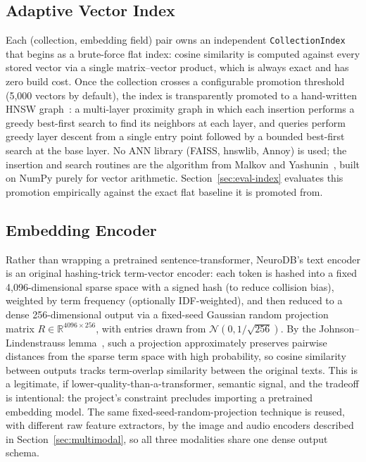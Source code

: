 \documentclass[conference]{IEEEtran}
\begin{document}
\subsection{Adaptive Vector Index}
\label{sec:index}

Each (collection, embedding field) pair owns an independent \texttt{CollectionIndex} that
begins as a brute-force flat index: cosine similarity is computed against every stored
vector via a single matrix--vector product, which is always exact and has zero build cost.
Once the collection crosses a configurable promotion threshold (5{,}000 vectors by default),
the index is transparently promoted to a hand-written HNSW graph~\cite{malkov2018hnsw}: a
multi-layer proximity graph in which each insertion performs a greedy best-first search to
find its neighbors at each layer, and queries perform greedy layer descent from a single
entry point followed by a bounded best-first search at the base layer. No ANN library
(FAISS, hnswlib, Annoy) is used; the insertion and search routines are the algorithm from
Malkov and Yashunin~\cite{malkov2018hnsw}, built on NumPy purely for vector arithmetic.
Section~\ref{sec:eval-index} evaluates this promotion empirically against the exact flat
baseline it is promoted from.

\subsection{Embedding Encoder}
\label{sec:embedding}

Rather than wrapping a pretrained sentence-transformer, NeuroDB's text encoder is an
original hashing-trick term-vector encoder: each token is hashed into a fixed 4{,}096-dimensional
sparse space with a signed hash (to reduce collision bias), weighted by term frequency
(optionally IDF-weighted), and then reduced to a dense 256-dimensional output via a
fixed-seed Gaussian random projection matrix $R \in \mathbb{R}^{4096 \times 256}$, with
entries drawn from $\mathcal{N}(0, 1/\sqrt{256})$. By the Johnson--Lindenstrauss
lemma~\cite{johnson1984extensions}, such a projection approximately preserves pairwise
distances from the sparse term space with high probability, so cosine similarity between
outputs tracks term-overlap similarity between the original texts. This is a legitimate,
if lower-quality-than-a-transformer, semantic signal, and the tradeoff is intentional: the
project's constraint precludes importing a pretrained embedding model. The same
fixed-seed-random-projection technique is reused, with different raw feature extractors, by
the image and audio encoders described in Section~\ref{sec:multimodal}, so all three
modalities share one dense output schema.
\end{document}
